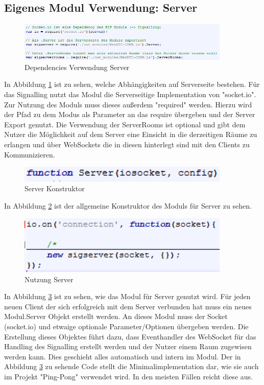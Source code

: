 \subsection{Eigenes Modul Verwendung: Server}
\begin{figure}[ht]
\centering
\includegraphics[width=0.9\textwidth]{backend/Modul_UserServerDependencies.PNG}
\caption{Dependencies Verwendung Server}
\label{backfig6}
\end{figure}
In Abbildung \ref{backfig6} ist zu sehen, welche Abhängigkeiten auf Serverseite bestehen.
Für das Signalling nutzt das Modul die Serverseitige Implementation von "socket.io". 
Zur Nutzung des Moduls muss dieses außerdem "required" werden. Hierzu wird der Pfad zu dem Modus als Parameter an das require übergeben und der Server Export genutzt.
Die Verwendung der ServerRooms ist optional und gibt dem Nutzer die Möglichkeit auf dem Server eine Einsicht in die derzeitigen Räume zu erlangen und über WebSockets die in diesen hinterlegt sind mit den Clients zu Kommunizieren.

\begin{figure}[ht]
\centering
\includegraphics[width=0.9\textwidth]{backend/Modul_ServerContructor.PNG}
\caption{Server Konstruktor}
\label{backfig7}
\end{figure}
In Abbildung \ref{backfig7} ist der allgemeine Konstruktor des Moduls für Server zu sehen.

\begin{figure}[ht]
\centering
\includegraphics[width=0.9\textwidth]{backend/Modul_UserServerHowTo.PNG}
\caption{Nutzung Server}
\label{backfig8}
\end{figure}
In Abbildung \ref{backfig8} ist zu sehen, wie das Modul für Server genutzt wird. Für jeden neuen Client der sich erfolgreich mit dem Server verbunden hat muss ein neues Modul.Server Objekt erstellt werden. An dieses Modul muss der Socket (socket.io) und etwaige optionale Parameter/Optionen übergeben werden. Die Erstellung dieses Objektes führt dazu, dass Eventhandler des WebSocket für das Handling des Signalling erstellt werden und der Nutzer einem Raum zugewisen werden kann. Dies geschieht alles automatisch und intern im Modul. Der in Abbildung \ref{backfig8} zu sehende Code stellt die Minimalimplementation dar, wie sie auch im Projekt "Ping-Pong" verwendet wird. In den meisten Fällen reicht diese aus.



